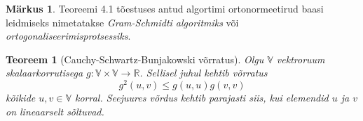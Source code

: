 \documentclass[a4paper,12pt]{article}
\theoremstyle{plain}
\newtheorem{teoreem}{Teoreem}[section]
\theoremstyle{definition}
\newtheorem{markus}{Märkus}[section]
\numberwithin{equation}{section}
\begin{document}
\begin{markus} \label{markus:gram-schmidt}
Teoreemi 4.1 tõestuses antud algortimi ortonormeetirud baasi leidmiseks nimetatakse \emph{Gram-Schmidti algoritmiks} või \emph{ortogonaliseerimisprotsessiks}.
\end{markus}

\begin{teoreem}[Cauchy-Schwartz-Bunjakowski võrratus] \textnormal{\cite[teoreem II.1.1.]{FA2}} \label{teoreem:C-S-B}
Olgu $\mathbb{V}$ vektroruum skalaarkorrutisega $g : \mathbb{V} \times \mathbb{V} \rightarrow \mathbb{R}$. Sellisel juhul kehtib võrratus
\begin{equation} \label{eq:C-S-B}
g^2 \left(u, v \right) \leq g \left(u, u \right) g \left(v, v \right)
\end{equation}
kõikide $u, v \in \mathbb{V}$ korral. Seejuures võrdus kehtib parajasti siis, kui elemendid $u$ ja $v$ on lineaarselt sõltuvad.
\end{teoreem}
\end{document}
